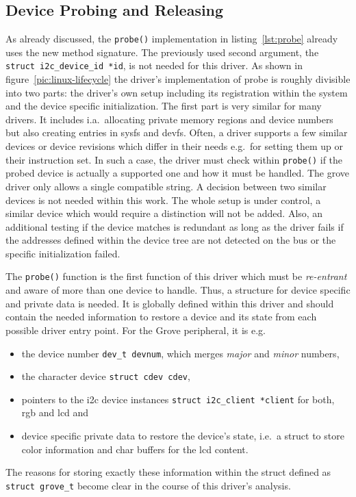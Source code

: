 \subsection{Device Probing and Releasing}
As already discussed, the \texttt{probe()} implementation in listing~\ref{lst:probe} already uses the new method signature.
The previously used second argument, the\\\texttt{struct i2c_device_id *id}, is not needed for this driver.
As shown in figure~\ref{pic:linux-lifecycle} the driver's implementation of probe is roughly divisible into two parts: the driver's own setup including its registration within the system and the device specific initialization.
The first part is very similar for many drivers.
It includes i.a.\ allocating private memory regions and device numbers but also creating entries in sysfs and devfs.
Often, a driver supports a few similar devices or device revisions which differ in their needs e.g.\ for setting them up or their instruction set.
In such a case, the driver must check within \texttt{probe()} if the probed device is actually a supported one and how it must be handled.
The grove driver only allows a single compatible string.
A decision between two similar devices is not needed within this work.
The whole setup is under control, a similar device which would require a distinction will not be added.
Also, an additional testing if the device matches is redundant as long as the driver fails if the addresses defined within the device tree are not detected on the bus or the specific initialization failed.

The \texttt{probe()} function is the first function of this driver which must be \textit{re-entrant} and aware of more than one device to handle.
Thus, a structure for device specific and private data is needed.
It is globally defined within this driver and should contain the needed information to restore a device and its state from each possible driver entry point.
For the Grove peripheral, it is e.g.\ 
\begin{itemize}
    \item the device number \texttt{dev_t devnum}, which merges \textit{major} and \textit{minor} numbers,
    \item the character device \texttt{struct cdev cdev},
    \item pointers to the \ac{i2c} device instances \texttt{struct i2c_client *client} for both, \ac{rgb} and \ac{lcd} and 
    \item device specific private data to restore the device's state, i.e.\ a struct to store color information and char buffers for the \ac{lcd} content.
\end{itemize}
The reasons for storing exactly these information within the struct defined as\\\texttt{struct grove_t} become clear in the course of this driver's analysis.

